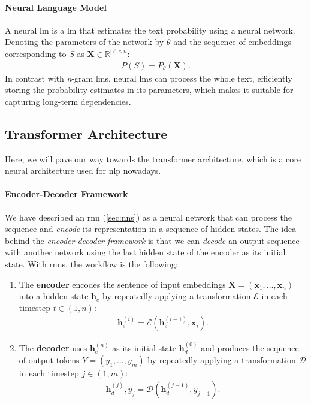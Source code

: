 \paragraph{Neural Language Model} A neural \ac{lm} is a \acl{lm} that estimates the text probability using a neural network. Denoting the parameters of the network by $\theta$ and the sequence of embeddings corresponding to $S$ as $\mathbf{X} \in \mathbb{R}^{|V|\times n}$:
\begin{align}
    P(S) = P_\theta(\mathbf{X}).
\end{align}
In contrast with \emph{n}-gram \acp{lm}, neural \acp{lm} can process the whole text, efficiently storing the probability estimates in its parameters, which makes it suitable for capturing long-term dependencies.

\subsection{Transformer Architecture}

Here, we will pave our way towards the transformer architecture, which is a core neural architecture used for \ac{nlp} nowadays.

\paragraph{Encoder-Decoder Framework}
We have described an \ac{rnn} (\autoref{sec:nns}) as a neural network that can process the sequence and \emph{encode} its representation in a sequence of hidden states. The idea behind the \emph{encoder-decoder framework} \cite{sutskever2014sequence,cho2014learning} is that we can \emph{decode} an output sequence with another network using the last hidden state of the encoder as its initial state. With \acp{rnn}, the workflow is the following:

\begin{enumerate}
    \item The \textbf{encoder} encodes the sentence of input embeddings $\mathbf{X}= (\mathbf{x}_1, \ldots, \mathbf{x}_n)$ into a hidden state $\mathbf{h}_e$ by repeatedly applying a transformation $\mathcal{E}$ in each timestep $t\in(1,n)$:
          \begin{align}
              \mathbf{h}_e^{(i)} = \mathcal{E}(\mathbf{h}_e^{(i-1)}, \mathbf{x}_i).
          \end{align}
    \item The \textbf{decoder} uses $\mathbf{h}_e^{(n)}$ as its initial state $\mathbf{h}_d^{(0)}$ and produces the sequence of output tokens  $Y = (y_1, \ldots, y_m)$ by repeatedly applying a transformation $\mathcal{D}$ in each timestep $j\in(1,m)$:
          \begin{align}
              \mathbf{h}_d^{(j)}, y_j = \mathcal{D}(\mathbf{h}_d^{(j-1)}, y_{j-1}).
          \end{align}
\end{enumerate}


